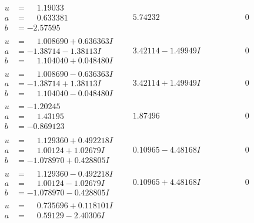 \documentclass[1p]{elsarticle_modified}
\theoremstyle{definition}
\begin{document}
$$\begin{array}{c|c|c}
\begin{aligned}
u &= \phantom{-}1.19033\phantom{ +0.000000I} \\
a &= \phantom{-}0.633381\phantom{ +0.000000I} \\
b &= -2.57595\phantom{ +0.000000I}\end{aligned}
 & \phantom{-}5.74232\phantom{ +0.000000I} & \phantom{-0.000000 } 0 \\ \hline\begin{aligned}
u &= \phantom{-}1.008690 + 0.636363 I \\
a &= -1.38714 - 1.38113 I \\
b &= \phantom{-}1.104040 + 0.048480 I\end{aligned}
 & \phantom{-}3.42114 - 1.49949 I & \phantom{-0.000000 } 0 \\ \hline\begin{aligned}
u &= \phantom{-}1.008690 - 0.636363 I \\
a &= -1.38714 + 1.38113 I \\
b &= \phantom{-}1.104040 - 0.048480 I\end{aligned}
 & \phantom{-}3.42114 + 1.49949 I & \phantom{-0.000000 } 0 \\ \hline\begin{aligned}
u &= -1.20245\phantom{ +0.000000I} \\
a &= \phantom{-}1.43195\phantom{ +0.000000I} \\
b &= -0.869123\phantom{ +0.000000I}\end{aligned}
 & \phantom{-}1.87496\phantom{ +0.000000I} & \phantom{-0.000000 } 0 \\ \hline\begin{aligned}
u &= \phantom{-}1.129360 + 0.492218 I \\
a &= \phantom{-}1.00124 + 1.02679 I \\
b &= -1.078970 + 0.428805 I\end{aligned}
 & \phantom{-}0.10965 - 4.48168 I & \phantom{-0.000000 } 0 \\ \hline\begin{aligned}
u &= \phantom{-}1.129360 - 0.492218 I \\
a &= \phantom{-}1.00124 - 1.02679 I \\
b &= -1.078970 - 0.428805 I\end{aligned}
 & \phantom{-}0.10965 + 4.48168 I & \phantom{-0.000000 } 0 \\ \hline\begin{aligned}
u &= \phantom{-}0.735696 + 0.118101 I \\
a &= \phantom{-}0.59129 - 2.40306 I \\

\end{aligned}
\end{array}$$
\end{document}
